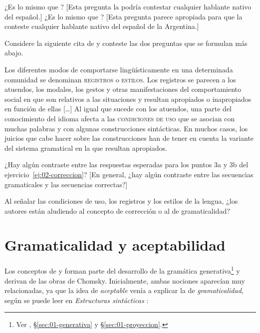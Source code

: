 \begin{ejercicio}
\begin{resuelto}
¿Es lo mismo  que ? [Esta pregunta la podría
contestar cualquier hablante nativo del español.] ¿Es lo mismo 
que ? [Esta pregunta parece apropiada para que la conteste
cualquier hablante nativo del español de la Argentina.]
\end{resuelto}
\end{ejercicio}

\begin{ejercicio}\label{ej:02-registros}
Considere la siguiente cita de \textcite[30]{bosque2009} y conteste las dos
preguntas que se formulan más abajo.

\begin{cita}
Los diferentes modos de comportarse lingüísticamente en una determinada
comunidad se denominan \textsc{registros} o \textsc{estilos}. Los registros se
parecen a los atuendos, los modales, los gestos y otras manifestaciones del
comportamiento social en que son relativos a las situaciones y resultan
apropiados o inapropiados en función de ellas [\ldots] Al igual que sucede con
los atuendos, una parte del conocimiento del idioma afecta a las
\textsc{condiciones de uso} que se asocian con muchas palabras y con algunas
construcciones sintácticas. En muchos casos, los juicios que cabe hacer sobre
las construcciones han de tener en cuenta la variante del sistema gramatical en
la que resultan apropiados.
\end{cita}

\begin{consignas}
  \item ¿Hay algún contraste entre las respuestas esperadas para los puntos 3a
        y 3b del ejercicio~\ref{ej:02-correccion}? [En general, ¿hay algún
        contraste entre las secuencias gramaticales y las secuencias
        correctas?]
  \item Al señalar las condiciones de uso, los registros y los estilos de la
        lengua, ¿los autores están aludiendo al concepto de corrección o al de
        gramaticalidad?
\end{consignas}
\end{ejercicio}

\section{Gramaticalidad y aceptabilidad}\label{sec:02-aceptabilidad}

Los conceptos de  y  forman
parte del desarrollo de la gramática generativa\footnote{Ver , §\ref{sec:01-generativa} y
§\ref{sec:01-proyeccion}.} y derivan de las obras de Chomsky. Inicialmente, ambas nociones
aparecían muy relacionadas, ya que la idea de \textit{aceptable} venía a
explicar la de \textit{gramaticalidad}, según se puede leer en
\textit{Estructuras sintácticas} \parencite{chomsky1974a}:

